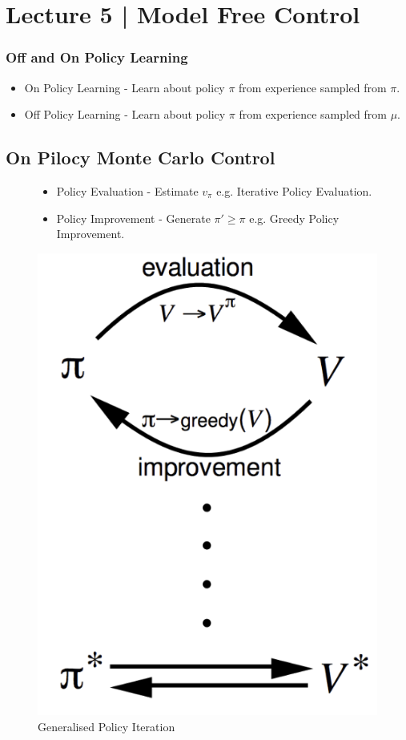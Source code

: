 \section{Lecture 5 | Model Free Control}

\subsubsection*{Off and On Policy Learning}
\begin{itemize}
  \item On Policy Learning - Learn about policy \(\pi \) from experience sampled from \(\pi \).
  \item Off Policy Learning - Learn about policy \(\pi \) from experience sampled from \(\mu \).
\end{itemize}

\subsection{On Pilocy Monte Carlo Control}

\begin{figure}[H]
    \begin{minipage}{0.5\textwidth}
        \begin{itemize}
            \item Policy Evaluation - Estimate \(v_\pi \) e.g. Iterative Policy Evaluation. 
            \item Policy Improvement - Generate \(\pi' \geq \pi \) e.g. Greedy Policy Improvement.
          \end{itemize}
    \end{minipage}%
    \begin{minipage}{0.5\textwidth}
      \centering
      \includegraphics[height=0.75\textwidth]{figures/gpi.png}
      \caption{Generalised Policy Iteration}
        \label{fig:gpi}
    \end{minipage}
  \end{figure}

